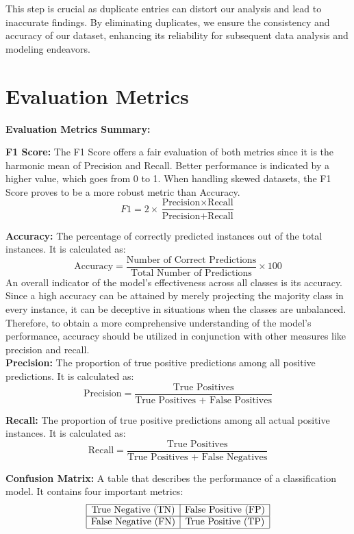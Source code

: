  This step is crucial as duplicate entries can distort our analysis and lead to inaccurate findings. By eliminating duplicates, we ensure the consistency and accuracy of our dataset, enhancing its reliability for subsequent data analysis and modeling endeavors.


\section{Evaluation Metrics}
\textbf{Evaluation Metrics Summary:}
\begin{itemize}
\textbf{F1 Score:} The F1 Score offers a fair evaluation of both metrics since it is the harmonic mean of Precision and Recall. Better performance is indicated by a higher value, which goes from 0 to 1. When handling skewed datasets, the F1 Score proves to be a more robust metric than Accuracy.
\[ F1 = 2 \times \frac{\text{Precision} \times \text{Recall}}{\text{Precision} + \text{Recall}} \]

\textbf{Accuracy:} The percentage of correctly predicted instances out of the total instances. It is calculated as:
\[ \text{Accuracy} = \frac{\text{Number of Correct Predictions}}{\text{Total Number of Predictions}} \times 100 \]
An overall indicator of the model's effectiveness across all classes is its accuracy. Since a high accuracy can be attained by merely projecting the majority class in every instance, it can be deceptive in situations when the classes are unbalanced. Therefore, to obtain a more comprehensive understanding of the model's performance, accuracy should be utilized in conjunction with other measures like precision and recall.
\\

\textbf{Precision:} The proportion of true positive predictions among all positive predictions. It is calculated as:
\[ \text{Precision} = \frac{\text{True Positives}}{\text{True Positives + False Positives}} \]

\textbf{Recall:} The proportion of true positive predictions among all actual positive instances. It is calculated as:
\[ \text{Recall} = \frac{\text{True Positives}}{\text{True Positives + False Negatives}} \]

\textbf{Confusion Matrix:} A table that describes the performance of a classification model. It contains four important metrics:
\[
\begin{array}{|c|c|}
\hline
\text{True Negative (TN)} & \text{False Positive (FP)} \\
\hline
\text{False Negative (FN)} & \text{True Positive (TP)} \\
\hline
\end{array}
\]
\


\end{itemize}
